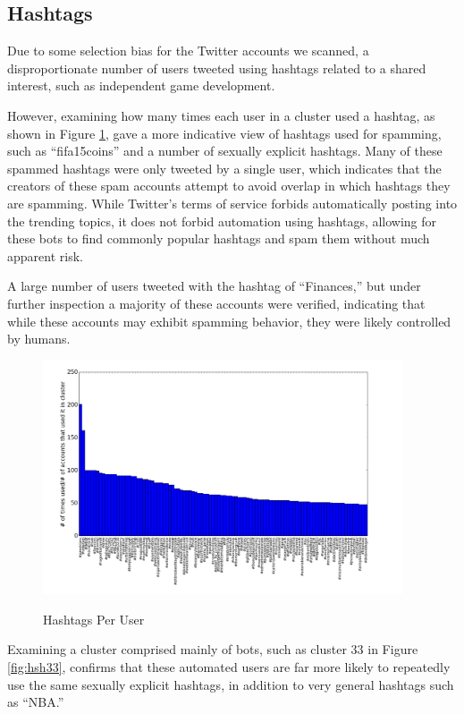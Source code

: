 \documentclass{sig-alternate-05-2015}
\begin{document}
\subsection{Hashtags}

Due to some selection bias for the Twitter accounts we scanned, a disproportionate number of users tweeted using hashtags related to a shared interest, such as independent game development.

However, examining how many times each user in a cluster used a hashtag, as shown in Figure \ref{fig:hsh}, gave a more indicative view of hashtags used for spamming, such as ``fifa15coins'' and a number of sexually explicit hashtags. Many of these spammed hashtags were only tweeted by a single user, which indicates that the creators of these spam accounts attempt to avoid overlap in which hashtags they are spamming. While Twitter's terms of service forbids automatically posting into the trending topics, it does not forbid automation using hashtags, allowing for these bots to find commonly popular hashtags and spam them without much apparent risk.

A large number of users tweeted with the hashtag of ``Finances,'' but under further inspection a majority of these accounts were verified, indicating that while these accounts may exhibit spamming behavior, they were likely controlled by humans.

\begin{figure}[h!]
	\caption{Hashtags Per User}
	\centering
		\includegraphics[width=0.95\textwidth]{imgs/bhvc}
	\label{fig:hsh}
\end{figure}

Examining a cluster comprised mainly of bots, such as cluster 33 in Figure \ref{fig:hsh33}, confirms that these automated users are far more likely to repeatedly use the same sexually explicit hashtags, in addition to very general hashtags such as ``NBA.''
\end{document}
